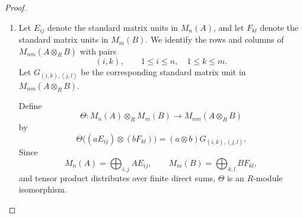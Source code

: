 \begin{proof}
\begin{enumerate}
              It remains to check that \(\Phi\) is an algebra homomorphism. Let
              \(X=(x_{ij})\), \(Y=(y_{ij})\in M_n(A)\), and let \(b,b'\in B\). Then
              \[
                  \Phi\bigl((X\otimes b)(Y\otimes b')\bigr)
                  =
                  \Phi(XY\otimes bb')
                  =
                  ( (XY)_{ik}\otimes bb')_{i,k}.
              \]
              On the other hand,
              \[
                  \Phi(X\otimes b)\Phi(Y\otimes b')
                  =
                  (x_{ij}\otimes b)_{i,j}(y_{jk}\otimes b')_{j,k},
              \]
              whose \((i,k)\)-entry is
              \[
                  \sum_j (x_{ij}\otimes b)(y_{jk}\otimes b')
                  =
                  \sum_j x_{ij}y_{jk}\otimes bb'
                  =
                  (XY)_{ik}\otimes bb'.
              \]
              Thus
              \[
                  \Phi\bigl((X\otimes b)(Y\otimes b')\bigr)
                  =
                  \Phi(X\otimes b)\Phi(Y\otimes b').
              \]
              Also,
              \[
                  \Phi(I_n\otimes 1_B)=I_n.
              \]
              Therefore
              \[
                  M_n(A)\otimes_R B \cong M_n(A\otimes_R B)
              \]
              as \(R\)-algebras.
    
        \item Let \(E_{ij}\) denote the standard matrix units in \(M_n(A)\), and let
              \(F_{kl}\) denote the standard matrix units in \(M_m(B)\). We identify
              the rows and columns of \(M_{nm}(A\otimes_R B)\) with pairs
              \[
                  (i,k),\qquad 1\leq i\leq n,\quad 1\leq k\leq m.
              \]
              Let \(G_{(i,k),(j,l)}\) be the corresponding standard matrix unit in
              \(M_{nm}(A\otimes_R B)\).
    
              Define
              \[
                  \Theta:M_n(A)\otimes_R M_m(B)
                  \longrightarrow
                  M_{nm}(A\otimes_R B)
              \]
              by
              \[
                  \Theta\bigl((aE_{ij})\otimes (bF_{kl})\bigr)
                  =
                  (a\otimes b)G_{(i,k),(j,l)}.
              \]
              Since
              \[
                  M_n(A)=\bigoplus_{i,j} AE_{ij},
                  \qquad
                  M_m(B)=\bigoplus_{k,l} BF_{kl},
              \]
              and tensor product distributes over finite direct sums, \(\Theta\) is an
              \(R\)-module isomorphism.
    

\end{enumerate}
\end{proof}

